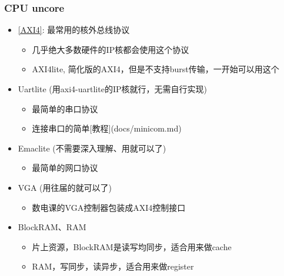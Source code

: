 \documentclass[lang=cn,11pt,a4paper]{elegantpaper}
\begin{document}
\subsubsection{CPU uncore}

\begin{itemize}
\item \href{run:../manuals/AXI4.pdf}{[AXI4]}: 最常用的核外总线协议
  \begin{itemize}
  \item 几乎绝大多数硬件的IP核都会使用这个协议
  \item AXI4lite, 简化版的AXI4，但是不支持burst传输，一开始可以用这个
  \end{itemize}
\item Uartlite (用axi4-uartlite的IP核就行，无需自行实现)
  \begin{itemize}
  \item 最简单的串口协议
  \item 连接串口的简单[教程](docs/minicom.md)
  \end{itemize}
\item Emaclite (不需要深入理解、用就可以了)
  \begin{itemize}
  \item 最简单的网口协议
  \end{itemize}
\item VGA (用往届的就可以了)
  \begin{itemize}
  \item 数电课的VGA控制器包装成AXI4控制接口
  \end{itemize}
\item BlockRAM、RAM
  \begin{itemize}
  \item 片上资源，BlockRAM是读写均同步，适合用来做cache
  \item RAM，写同步，读异步，适合用来做register
  \end{itemize}
\end{itemize}
\end{document}
